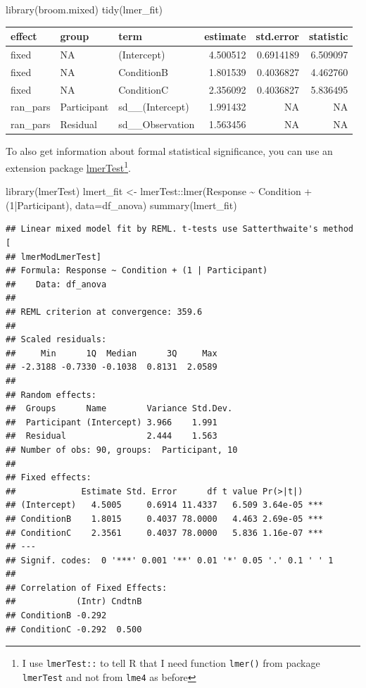 \documentclass[
]{book}
\newenvironment{Shaded}{\begin{snugshade}}{\end{snugshade}}
\newcommand{\AttributeTok}[1]{\textcolor[rgb]{0.77,0.63,0.00}{#1}}
\newcommand{\DecValTok}[1]{\textcolor[rgb]{0.00,0.00,0.81}{#1}}
\newcommand{\FunctionTok}[1]{\textcolor[rgb]{0.00,0.00,0.00}{#1}}
\newcommand{\NormalTok}[1]{#1}
\newcommand{\OtherTok}[1]{\textcolor[rgb]{0.56,0.35,0.01}{#1}}
\newcommand{\SpecialCharTok}[1]{\textcolor[rgb]{0.00,0.00,0.00}{#1}}
\begin{document}
\begin{Shaded}
\begin{Highlighting}[]
\FunctionTok{library}\NormalTok{(broom.mixed)}
\FunctionTok{tidy}\NormalTok{(lmer\_fit)}
\end{Highlighting}
\end{Shaded}

\begin{tabular}{l|l|l|r|r|r}
\hline
effect & group & term & estimate & std.error & statistic\\
\hline
fixed & NA & (Intercept) & 4.500512 & 0.6914189 & 6.509097\\
\hline
fixed & NA & ConditionB & 1.801539 & 0.4036827 & 4.462760\\
\hline
fixed & NA & ConditionC & 2.356092 & 0.4036827 & 5.836495\\
\hline
ran\_pars & Participant & sd\_\_(Intercept) & 1.991432 & NA & NA\\
\hline
ran\_pars & Residual & sd\_\_Observation & 1.563456 & NA & NA\\
\hline
\end{tabular}

To also get information about formal statistical significance, you can use an extension package \href{https://github.com/runehaubo/lmerTestR}{lmerTest}\footnote{I use \texttt{lmerTest::} to tell R that I need function \texttt{lmer()} from package \texttt{lmerTest} and not from \texttt{lme4} as before}.

\begin{Shaded}
\begin{Highlighting}[]
\FunctionTok{library}\NormalTok{(lmerTest)}
\NormalTok{lmert\_fit }\OtherTok{\textless{}{-}}\NormalTok{ lmerTest}\SpecialCharTok{::}\FunctionTok{lmer}\NormalTok{(Response }\SpecialCharTok{\textasciitilde{}}\NormalTok{ Condition }\SpecialCharTok{+}\NormalTok{ (}\DecValTok{1}\SpecialCharTok{|}\NormalTok{Participant), }\AttributeTok{data=}\NormalTok{df\_anova)}
\FunctionTok{summary}\NormalTok{(lmert\_fit)}
\end{Highlighting}
\end{Shaded}

\begin{verbatim}
## Linear mixed model fit by REML. t-tests use Satterthwaite's method [
## lmerModLmerTest]
## Formula: Response ~ Condition + (1 | Participant)
##    Data: df_anova
## 
## REML criterion at convergence: 359.6
## 
## Scaled residuals: 
##     Min      1Q  Median      3Q     Max 
## -2.3188 -0.7330 -0.1038  0.8131  2.0589 
## 
## Random effects:
##  Groups      Name        Variance Std.Dev.
##  Participant (Intercept) 3.966    1.991   
##  Residual                2.444    1.563   
## Number of obs: 90, groups:  Participant, 10
## 
## Fixed effects:
##             Estimate Std. Error      df t value Pr(>|t|)    
## (Intercept)   4.5005     0.6914 11.4337   6.509 3.64e-05 ***
## ConditionB    1.8015     0.4037 78.0000   4.463 2.69e-05 ***
## ConditionC    2.3561     0.4037 78.0000   5.836 1.16e-07 ***
## ---
## Signif. codes:  0 '***' 0.001 '**' 0.01 '*' 0.05 '.' 0.1 ' ' 1
## 
## Correlation of Fixed Effects:
##            (Intr) CndtnB
## ConditionB -0.292       
## ConditionC -0.292  0.500
\end{verbatim}
\end{document}
